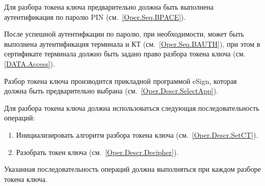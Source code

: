 Для разбора токена ключа предварительно 
должна быть выполнена аутентификация по 
паролю PIN  (см.~\ref{Oper.Seq.BPACE}).

После успешной аутентифкации по паролю,
при необходимости, может быть выполнена аутентификация 
терминала и КТ (см.~\ref{Oper.Seq.BAUTH}),
при этом в сертификате терминала должно быть задано право
разбора токена ключа (см. \ref{DATA.Access}).

Разбор токена ключа производится прикладной программой eSign, которая
должна быть предварительно выбрана (см.~\ref{Oper.Descr.SelectApp}).

Для разбора токена ключа должна использоваться 
следующая последовательность операций:
%
\begin{enumerate}
\item Инициализировать алгоритм разбора токена ключа (см.~\ref{Oper.Descr.SetCT}).
\item Разобрать токен ключа (см.~\ref{Oper.Descr.Decipher}).
\end{enumerate}
%
Указанная последовательность операций должна выполняться
при каждом разборе токена ключа.

